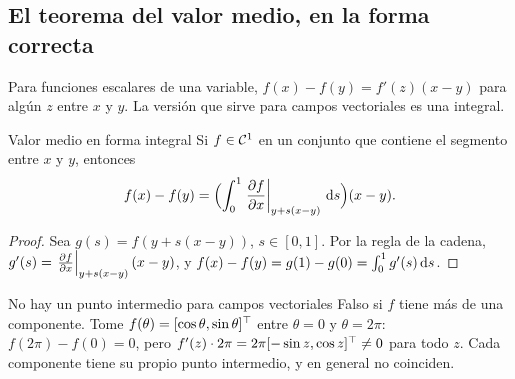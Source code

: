\subsection{El teorema del valor medio, en la forma correcta}

Para funciones escalares de una variable, $f(x)-f(y)=f'(z)(x-y)$ para algún $z$ entre $x$ y $y$. La versión que sirve para campos vectoriales es una integral.

\begin{lema}[label=lem:pm-valormedio]{Valor medio en forma integral}
Si $f\in\mathcal{C}^{1}$ en un conjunto que contiene el segmento entre $x$ y $y$, entonces
\[
  f(x)-f(y)=\Bigl(\int_0^1\left.\frac{\partial f}{\partial x}\right|_{y+s(x-y)}\,\mathrm{d} s\Bigr)(x-y) .
\]
\end{lema}

\begin{proof}
Sea $g(s)=f(y+s(x-y))$, $s\in[0,1]$. Por la regla de la cadena, $g'(s)=\left.\frac{\partial f}{\partial x}\right|_{y+s(x-y)}(x-y)$, y $f(x)-f(y)=g(1)-g(0)=\int_0^1g'(s)\,\mathrm{d} s$.
\end{proof}

\begin{trampa}[label=tr:pm-valormedio]{No hay un punto intermedio para campos vectoriales}
Falso si $f$ tiene más de una componente. Tome $f(\theta)=[\cos\theta,\sin\theta]^{\top}$ entre $\theta=0$ y $\theta=2\pi$: $f(2\pi)-f(0)=0$, pero $f'(z)\cdot2\pi=2\pi[-\sin z,\cos z]^{\top}\neq0$ para todo $z$. Cada componente tiene su propio punto intermedio, y en general no coinciden.
\end{trampa}
